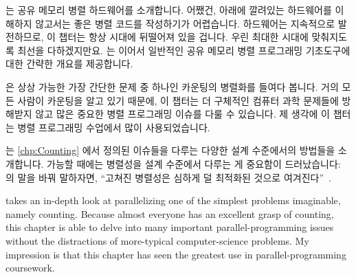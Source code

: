  는 공유 메모리 병렬 하드웨어를
소개합니다.
어쨌건, 아래에 깔려있는 하드웨어를 이해하지 않고서는 좋은 병렬 코드를
작성하기가 어렵습니다.
하드웨어는 지속적으로 발전하므로, 이 챕터는 항상 시대에 뒤떨어져 있을 겁니다.
우린 최대한 시대에 맞춰지도록 최선을 다하겠지만요.
 는 이어서 일반적인 공유 메모리 병렬
프로그래밍 기초도구에 대한 간략한 개요를 제공합니다.

\iffalse

This book is a handbook of widely applicable and heavily
used design techniques, rather than
a collection of optimal algorithms with tiny areas of applicability.
You are currently reading \cref{chp:How To Use This Book}, but
you knew that already.
\Cref{chp:Introduction} gives a high-level overview of parallel
programming.

\Cref{chp:Hardware and its Habits} introduces shared-memory
parallel hardware.
After all, it is difficult to write good parallel code unless you
understand the underlying hardware.
Because hardware constantly evolves, this chapter will always be
out of date.
We will nevertheless do our best to keep up.
\Cref{chp:Tools of the Trade} then provides a very brief overview
of common shared-memory parallel-programming primitives.

\fi

 은 상상 가능한 가장 간단한 문제 중 하나인 카운팅의
병렬화를 들여다 봅니다.
거의 모든 사람이 카운팅을 알고 있기 때문에, 이 챕터는 더 구체적인 컴퓨터 과학
문제들에 방해받지 않고 많은 중요한 병렬 프로그래밍 이슈를 다룰 수 있습니다.
제 생각에 이 챕터는 병렬 프로그래밍 수업에서 많이 사용되었습니다.

는 \cref{chp:Counting} 에서 정의된 이슈들을 다루는 다양한 설계
수준에서의 방법들을 소개합니다.
가능할 때에는 병렬성을 설계 수준에서 다루는 게 중요함이 드러났습니다:
~\cite{Dijkstra:1968:LEG:362929.362947} 의 말을
바꿔 말하자면, ``고쳐진 병렬성은 심하게 덜 최적화된 것으로
여겨진다''~\cite{PaulEMcKenney2012HOTPARsuboptimal}.

\iffalse

 takes an in-depth look at parallelizing
one of the simplest problems imaginable, namely counting.
Because almost everyone has an excellent grasp of counting, this chapter
is able to delve into many important parallel-programming issues without
the distractions of more-typical computer-science problems.
My impression is that this chapter has seen the greatest use in
parallel-programming coursework.

